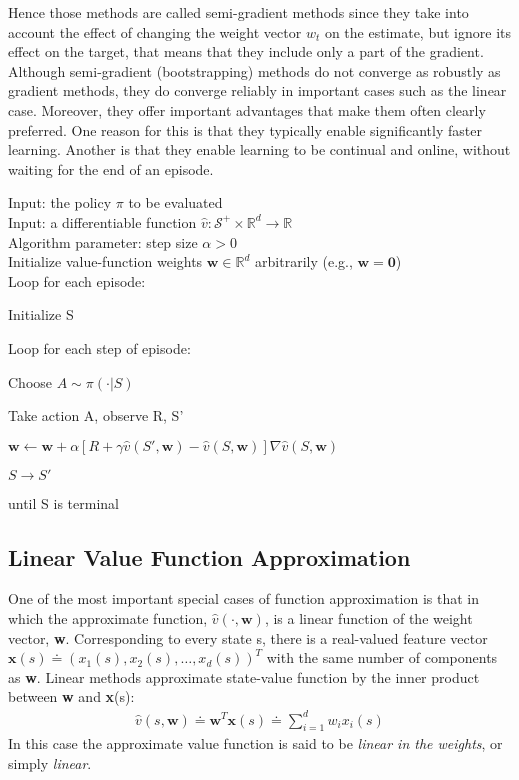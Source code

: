 Hence those methods are called semi-gradient methods since they take into account the effect of changing the weight vector $w_t$ on the estimate, but ignore its effect on the target, that means that they include only a part of the gradient. Although semi-gradient (bootstrapping) methods do not converge as robustly as gradient methods, they do converge reliably in important cases such as the linear case. Moreover, they offer important advantages that make them
often clearly preferred. One reason for this is that they typically enable significantly faster learning. Another is that they enable learning to be continual and online, without waiting for the end of an episode.
\begin{tcolorbox}[colback=black!7!white,colframe=black!75!white,title=\textbf{Semi-gradient TD(0) for Estimating} $\mathbf{\hat{v}\approx v_\pi}$]
Input: the policy $\pi$ to be evaluated\\
Input: a differentiable function $\hat{v}: \mathcal{S}^+\times\mathbb{R}^d\rightarrow\mathbb{R}$\\
Algorithm parameter: step size $\alpha > 0$\\
Initialize value-function weights $\mathbf{w}\in\mathbb{R}^d$ arbitrarily (e.g., $\mathbf{w=0}$)\\

Loop for each episode:

    \qquad Initialize S

    \qquad Loop for each step of episode:

    \qquad\qquad Choose $A\sim\pi(\cdot|S)$

    \qquad\qquad Take action A, observe R, S'

    \qquad\qquad $\mathbf{w}\leftarrow\mathbf{w}+\alpha[R+\gamma\hat{v}(S', \mathbf{w})-\hat{v}(S, \mathbf{w})]\nabla \hat{v}(S, \mathbf{w})$

    \qquad\qquad $S\rightarrow S'$

    \qquad until S is terminal
\end{tcolorbox}

\subsection{Linear Value Function Approximation}
One of the most important special cases of function approximation is that in which the approximate function, $\hat{v}(\cdot,\mathbf{w})$, is a linear function of the weight vector, \textbf{w}. Corresponding to every state s, there is a real-valued feature vector $\mathbf{x}(s)\doteq (x_1(s), x_2(s), \dots, x_d(s))^T$ with the same number of components as \textbf{w}. Linear methods approximate state-value function by the inner product between \textbf{w} and \textbf{x}(s):
\begin{align}
    \hat{v}(s,\mathbf{w})\doteq \mathbf{w}^T\mathbf{x}(s)\doteq\sum_{i=1}^d w_i x_i(s)
\end{align}
In this case the approximate value function is said to be \textit{linear in the weights}, or simply \textit{linear}.

